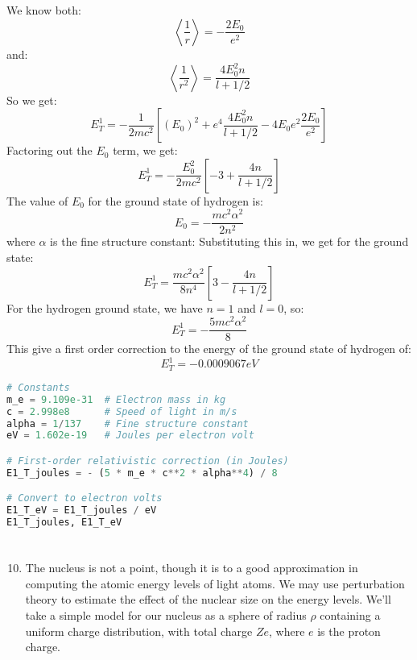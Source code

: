 \documentclass[12pt]{article}
\begin{document}
\subsection{}
We know both:
\begin{equation}
  \left\langle\frac{1}{r}\right\rangle = -\frac{2E_0}{e^{2}}
\end{equation}
and:
\begin{equation}
  \left\langle\frac{1}{r^2}\right\rangle = \frac{4E_{0}^{2}n}{l + 1 / 2}
\end{equation}
So we get:
\begin{equation}
  E^{1}_T = -\frac{1}{2mc^{2}}  \left[ (E_0)^{2}+e^4\frac{4E_{0}^{2}n}{l + 1 / 2}-4E_0e^2\frac{2E_0}{e^{2}}\right]
\end{equation}
Factoring out the $E_0$ term, we get:
\begin{equation}
  E^{1}_T = - \frac{E_0^2}{2mc^2} \left[-3 + \frac{4n}{l + 1 / 2} \right]
\end{equation}
The value of $E_0$ for the ground state of hydrogen is:
\begin{equation}
  E_0 = -\frac{mc^2\alpha^2}{2n^2}
\end{equation}
where $\alpha$ is the fine structure constant:
Substituting this in, we get for the ground state:
\begin{equation}
  E^{1}_T = \frac{mc^2\alpha^2}{8n^4} \left[3 - \frac{4n}{l + 1 / 2} \right]
\end{equation}
For the hydrogen ground state, we have $n=1$ and $l=0$, so:
\begin{equation}
  E_T^1 = -\frac{5mc^2\alpha^2}{8} 
\end{equation}
This give a first order correction to the energy of the ground state of hydrogen of:
\begin{equation}
  E^{1}_T = -0.0009067 eV
\end{equation}
\begin{lstlisting}[language=Python]
# Constants
m_e = 9.109e-31  # Electron mass in kg
c = 2.998e8      # Speed of light in m/s
alpha = 1/137    # Fine structure constant
eV = 1.602e-19   # Joules per electron volt

# First-order relativistic correction (in Joules)
E1_T_joules = - (5 * m_e * c**2 * alpha**4) / 8

# Convert to electron volts
E1_T_eV = E1_T_joules / eV
E1_T_joules, E1_T_eV

\end{lstlisting}
\section{}
\begin{enumerate}
  \setcounter{enumi}{9}
  \item The nucleus is not a point, though it is to a good approximation in computing the atomic energy levels of light atoms. We may use perturbation theory to estimate the effect of the nuclear size on the energy levels. We'll take a simple model for our nucleus as a sphere of radius $\rho$ containing a uniform charge distribution, with total charge $Z e$, where $e$ is the proton charge.
\end{enumerate}
\end{document}
